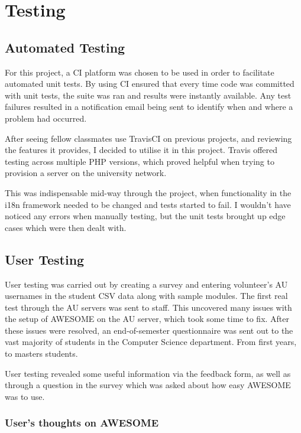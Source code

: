 \chapter{Testing}
	
	\section{Automated Testing}
	\label{sec:automatedtesting}
	
	For this project, a \ac{CI} platform was chosen to be used in order to facilitate automated unit tests.
	By using \ac{CI} ensured that every time code was committed with unit tests, the suite was ran and results were instantly available.
	Any test failures resulted in a notification email being sent to identify when and where a problem had occurred.
	
	After seeing fellow classmates use TravisCI on previous projects, and reviewing the features it provides, I decided to utilise it in this project.
	Travis offered testing across multiple PHP versions, which proved helpful when trying to provision a server on the university network.
	
	This was indispensable mid-way through the project, when functionality in the \ac{i18n} framework needed to be changed and tests started to fail.
	I wouldn't have noticed any errors when manually testing, but the unit tests brought up edge cases which were then dealt with.
	
	\section{User Testing}
	
	User testing was carried out by creating a survey and entering volunteer's \ac{AU} usernames in the student \ac{CSV} data along with sample modules.
	The first real test through the \ac{AU} servers was sent to staff.
	This uncovered many issues with the setup of \ac{AWESOME} on the \ac{AU} server, which took some time to fix.
	After these issues were resolved, an end-of-semester questionnaire was sent out to the vast majority of students in the Computer Science department.
	From first years, to masters students.
	
	User testing revealed some useful information via the feedback form, as well as through a question in the survey which was asked about how easy \ac{AWESOME} was to use.
	
	\subsection{User's thoughts on \ac{AWESOME}}
	

